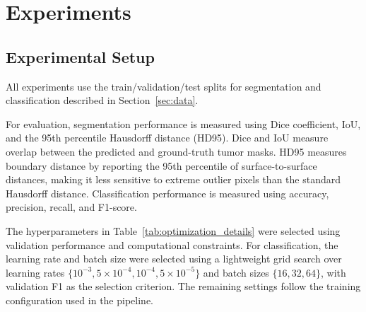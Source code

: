 \section{Experiments}
\label{sec:experiments}

\subsection{Experimental Setup}
All experiments use the train/validation/test splits for segmentation and classification described in Section~\ref{sec:data}.

For evaluation, segmentation performance is measured using Dice coefficient, IoU, and the 95th percentile Hausdorff distance (HD95). Dice and IoU measure overlap between the predicted and ground-truth tumor masks. HD95 measures boundary distance by reporting the 95th percentile of surface-to-surface distances, making it less sensitive to extreme outlier pixels than the standard Hausdorff distance. Classification performance is measured using accuracy, precision, recall, and F1-score.

The hyperparameters in Table~\ref{tab:optimization_details} were selected using validation performance and computational constraints. For classification, the learning rate and batch size were selected using a lightweight grid search over learning rates $\{10^{-3}, 5 \times 10^{-4}, 10^{-4}, 5 \times 10^{-5}\}$ and batch sizes $\{16, 32, 64\}$, with validation F1 as the selection criterion. The remaining settings follow the training configuration used in the pipeline.

\begin{table}[H]
    \centering
    \small
    \caption{Training hyperparameters used in the main experiments.}
    \label{tab:optimization_details}
    \setlength{\tabcolsep}{3pt}
\end{table}

